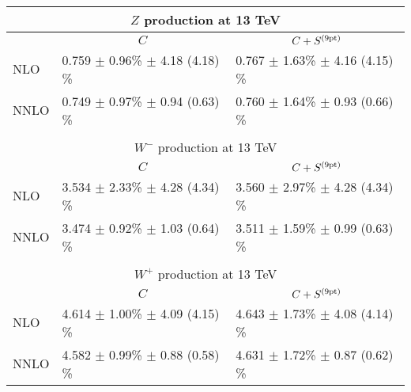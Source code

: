 \renewcommand*{\arraystretch}{1.5}
\begin{tabular}{lll}
\multicolumn{3}{c}{$Z$ production at 13 TeV}\\
\toprule
     & \multicolumn{1}{c}{$C$} & \multicolumn{1}{c}{$C+S^{(\rm 9pt)}$} \\
\midrule
NLO   &  0.759 $\pm$ 0.96\% $\pm$ 4.18 (4.18) \%   & 0.767 $\pm$ 1.63\% $\pm$ 4.16 (4.15) \% \\
NNLO  &  0.749 $\pm$ 0.97\% $\pm$ 0.94 (0.63) \%   & 0.760 $\pm$ 1.64\% $\pm$ 0.93 (0.66) \% \\
\bottomrule
\\[-0.3cm]
\multicolumn{3}{c}{$W^-$ production at 13 TeV}\\
\toprule
     & \multicolumn{1}{c}{$C$} & \multicolumn{1}{c}{$C+S^{(\rm 9pt)}$} \\
\midrule
NLO   &  3.534 $\pm$ 2.33\% $\pm$ 4.28 (4.34) \%   & 3.560 $\pm$ 2.97\% $\pm$ 4.28 (4.34) \% \\
NNLO  &  3.474 $\pm$ 0.92\% $\pm$ 1.03 (0.64) \%   & 3.511 $\pm$ 1.59\% $\pm$ 0.99 (0.63) \% \\
\bottomrule
\\[-0.3cm]
\multicolumn{3}{c}{$W^+$ production at 13 TeV}\\
\toprule
     & \multicolumn{1}{c}{$C$} & \multicolumn{1}{c}{$C+S^{(\rm 9pt)}$} \\
\midrule
NLO   &  4.614 $\pm$ 1.00\% $\pm$ 4.09 (4.15) \%   & 4.643 $\pm$ 1.73\% $\pm$ 4.08 (4.14) \% \\
NNLO  &  4.582 $\pm$ 0.99\% $\pm$ 0.88 (0.58) \%   & 4.631 $\pm$ 1.72\% $\pm$ 0.87 (0.62) \% \\
\end{tabular}
